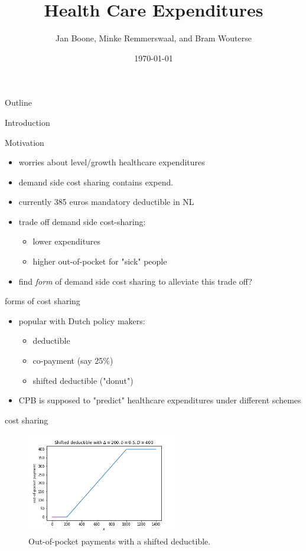 \documentclass[presentation]{beamer}
\author{Jan Boone, Minke Remmerswaal, and Bram Wouterse}
\date{\today}
\title{Health Care Expenditures}
\begin{document}
\begin{frame}{Outline}
\setcounter{tocdepth}{1}
\tableofcontents
\end{frame}


\begin{frame}[label={sec:org8a489c8}]{Introduction}
\begin{block}{Motivation}
\begin{itemize}
\item worries about level/growth healthcare expenditures
\item demand side cost sharing contains expend.
\item currently 385 euros mandatory deductible in NL
\item trade off demand side cost-sharing:
\begin{itemize}
\item lower expenditures
\item higher out-of-pocket for "sick" people
\end{itemize}
\item find \emph{form} of demand side cost sharing to alleviate this trade off?
\end{itemize}
\end{block}

\begin{block}{forms of cost sharing}
\begin{itemize}
\item popular with Dutch policy makers:
\begin{itemize}
\item deductible
\item co-payment (say 25\%)
\item shifted deductible ("donut")
\end{itemize}
\item CPB is supposed to "predict" healthcare expenditures under different schemes
\end{itemize}
\end{block}

\begin{block}{cost sharing}
\begin{figure}[htbp]
\centering
\includegraphics[width=250px]{./shiftedD.png}
\caption{\label{fig:shiftedD}
Out-of-pocket payments with a shifted deductible.}
\end{figure}
\end{block}



\end{frame}
\end{document}
